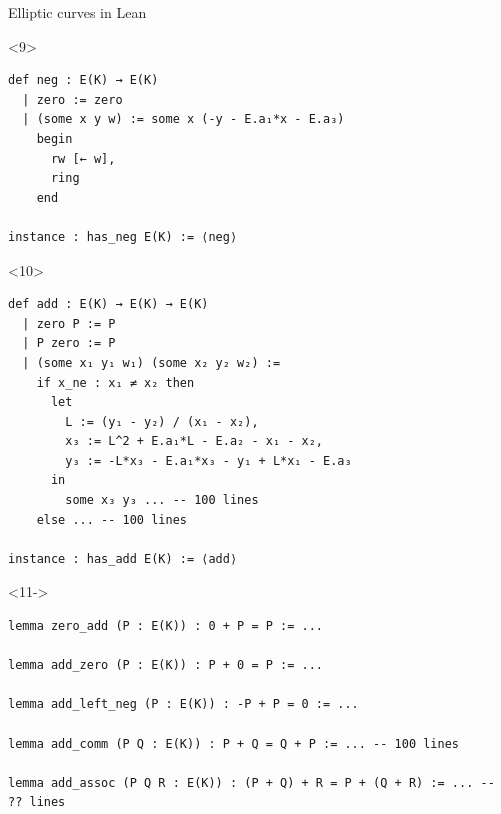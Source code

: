 \documentclass[10pt]{beamer}
\begin{document}
\begin{frame}[fragile, t]{Elliptic curves in Lean}

\begin{onlyenv}<9>
\begin{lstlisting}[basicstyle=\scriptsize, frame=single]
def neg : E(K) → E(K)
  | zero := zero
  | (some x y w) := some x (-y - E.a₁*x - E.a₃)
    begin
      rw [← w],
      ring
    end

instance : has_neg E(K) := ⟨neg⟩
\end{lstlisting}
\end{onlyenv}


\begin{onlyenv}<10>
\begin{lstlisting}[basicstyle=\scriptsize, frame=single]
def add : E(K) → E(K) → E(K)
  | zero P := P
  | P zero := P
  | (some x₁ y₁ w₁) (some x₂ y₂ w₂) :=
    if x_ne : x₁ ≠ x₂ then
      let
        L := (y₁ - y₂) / (x₁ - x₂),
        x₃ := L^2 + E.a₁*L - E.a₂ - x₁ - x₂,
        y₃ := -L*x₃ - E.a₁*x₃ - y₁ + L*x₁ - E.a₃
      in
        some x₃ y₃ ... -- 100 lines
    else ... -- 100 lines

instance : has_add E(K) := ⟨add⟩
\end{lstlisting}
\end{onlyenv}

 

\begin{onlyenv}<11->
\begin{lstlisting}[basicstyle=\scriptsize, frame=single]
lemma zero_add (P : E(K)) : 0 + P = P := ...

lemma add_zero (P : E(K)) : P + 0 = P := ...

lemma add_left_neg (P : E(K)) : -P + P = 0 := ...

lemma add_comm (P Q : E(K)) : P + Q = Q + P := ... -- 100 lines

lemma add_assoc (P Q R : E(K)) : (P + Q) + R = P + (Q + R) := ... -- ?? lines
\end{lstlisting}
\end{onlyenv}


\end{frame}
\end{document}
